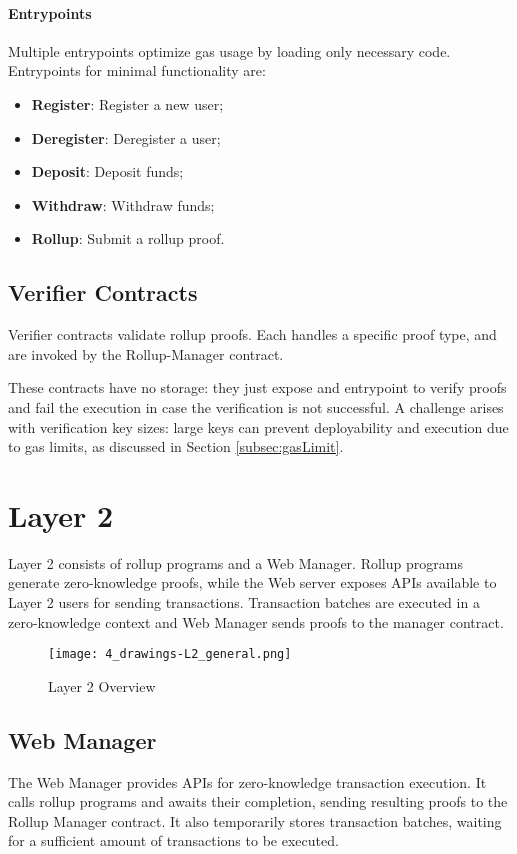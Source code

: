 \paragraph{Entrypoints}
Multiple entrypoints optimize gas usage by loading only necessary code. Entrypoints for minimal functionality are:
\begin{itemize}
  \item \textbf{Register}: Register a new user;
  \item \textbf{Deregister}: Deregister a user;
  \item \textbf{Deposit}: Deposit funds;
  \item \textbf{Withdraw}: Withdraw funds;
  \item \textbf{Rollup}: Submit a rollup proof.
\end{itemize}

\subsection{Verifier Contracts\label{sec:designverifiercontracts}}
Verifier contracts validate rollup proofs. Each handles a specific proof type, and are invoked by the Rollup-Manager contract.

These contracts have no storage: they just expose and entrypoint to verify proofs and fail the execution in case the verification is not successful. A challenge arises with verification key sizes: large keys can prevent deployability and execution due to gas limits, as discussed in Section \ref{subsec:gasLimit}.

\section{Layer 2\label{sec:designLayer2}}
Layer 2 consists of rollup programs and a Web Manager. Rollup programs generate zero-knowledge proofs, while the Web server exposes APIs available to Layer 2 users for sending transactions. Transaction batches are executed in a zero-knowledge context and Web Manager sends proofs to the manager contract.

\begin{figure}[htb]
  \centering
  \texttt{[image: 4\_drawings-L2\_general.png]}
  \caption{Layer 2 Overview}
  \label{fig:Layer2overview}
\end{figure}

\subsection{Web Manager\label{sec:designwebserver}}
The Web Manager provides APIs for zero-knowledge transaction execution. It calls rollup programs and awaits their completion, sending resulting proofs to the Rollup Manager contract. It also temporarily stores transaction batches, waiting for a sufficient amount of transactions to be executed.

